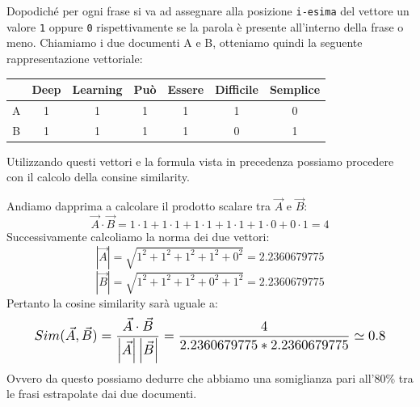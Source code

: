 Dopodiché per ogni frase si va ad assegnare alla posizione \texttt{i-esima} del vettore un valore \texttt{1} oppure \texttt{0} rispettivamente se la parola è presente all'interno della frase o meno. Chiamiamo i due documenti A e B, otteniamo quindi la seguente rappresentazione vettoriale:

\begin{table}[h]
\centering
\begin{tabular}{|c|c|c|c|c|c|c|}
\hline
        & Deep  & Learning  & Può       & Essere    & Difficile & Semplice  \\ \hline
A & 1     & 1         & 1         & 1         & 1         & 0         \\ \hline
B & 1     & 1         & 1         & 1         & 0         & 1         \\ \hline
\end{tabular}
\end{table}

Utilizzando questi vettori e la formula vista in precedenza possiamo procedere con il calcolo della consine similarity.

\begin{center}
\end{center}
Andiamo dapprima a calcolare il prodotto scalare tra $\vec{A}$ e $\vec{B}$:
\begin{equation}
    \vec{A}\cdot \vec{B}=1\cdot1+1\cdot1+1\cdot1+1\cdot1+1\cdot0+0\cdot1=4
\end{equation}
Successivamente calcoliamo la norma dei due vettori:
\begin{equation}
    \left |\vec{A} \right|=\sqrt{1^2+1^2+1^2+1^2+0^2}=2.2360679775
\end{equation}
\begin{equation}
    \left |\vec{B} \right|=\sqrt{1^2+1^2+1^2+0^2+1^2}=2.2360679775
\end{equation}
Pertanto la cosine similarity sarà uguale a:
\begin{equation}
    \scaleto{Sim(\vec{A},\vec{B})=\frac{\vec{A}\cdot \vec{B}}{\left |\vec{A} \right|\left | \vec{B} \right |}=\frac{4}{2.2360679775*2.2360679775}\simeq0.8}{40pt}
\end{equation}
Ovvero da questo possiamo dedurre che abbiamo una somiglianza pari all'80\% tra le frasi estrapolate dai due documenti.